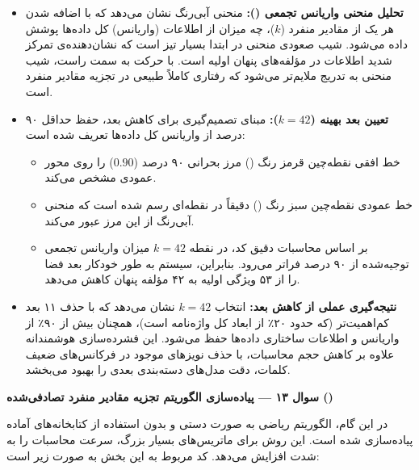\documentclass{article}
\begin{document}
    \begin{itemize}
        \item \textbf{تحلیل منحنی واریانس تجمعی ():}
        منحنی آبی‌رنگ نشان می‌دهد که با اضافه شدن هر یک از مقادیر منفرد ($k$)، چه میزان از اطلاعات (واریانس) کل داده‌ها پوشش داده می‌شود. شیب صعودی منحنی در ابتدا بسیار تیز است که نشان‌دهنده‌ی تمرکز شدید اطلاعات در مؤلفه‌های پنهان اولیه است. با حرکت به سمت راست، شیب منحنی به تدریج ملایم‌تر می‌شود که رفتاری کاملاً طبیعی در تجزیه مقادیر منفرد است.

        \item \textbf{تعیین بعد بهینه ($k=42$):}
        مبنای تصمیم‌گیری برای کاهش بعد، حفظ حداقل ۹۰ درصد از واریانس کل داده‌ها تعریف شده است:
        \begin{itemize}
            \item خط افقی نقطه‌چین قرمز رنگ () مرز بحرانی ۹۰ درصد ($0.90$) را روی محور عمودی مشخص می‌کند.
            \item خط عمودی نقطه‌چین سبز رنگ () دقیقاً در نقطه‌ای رسم شده است که منحنی آبی‌رنگ از این مرز عبور می‌کند.
            \item بر اساس محاسبات دقیق کد، در نقطه $k = 42$ میزان واریانس تجمعی توجیه‌شده از ۹۰ درصد فراتر می‌رود. بنابراین، سیستم به طور خودکار بعد فضا را از ۵۳ ویژگی اولیه به ۴۲ مؤلفه پنهان کاهش می‌دهد.
        \end{itemize}

        \item \textbf{نتیجه‌گیری عملی از کاهش بعد:}
        انتخاب $k=42$ نشان می‌دهد که با حذف ۱۱ بعد کم‌اهمیت‌تر (که حدود ۲۰٪ از ابعاد کل واژه‌نامه است)، همچنان بیش از ۹۰٪ از واریانس و اطلاعات ساختاری داده‌ها حفظ می‌شود. این فشرده‌سازی هوشمندانه علاوه بر کاهش حجم محاسبات، با حذف نویزهای موجود در فرکانس‌های ضعیف کلمات، دقت مدل‌های دسته‌بندی بعدی را بهبود می‌بخشد.
    \end{itemize}    

\noindent\textbf{سوال ۱۳ --- پیاده‌سازی الگوریتم تجزیه مقادیر منفرد تصادفی‌شده ()}
    
   \noindent در این گام، الگوریتم ریاضی  به صورت دستی و بدون استفاده از کتابخانه‌های آماده پیاده‌سازی شده است. این روش برای ماتریس‌های بسیار بزرگ، سرعت محاسبات را به شدت افزایش می‌دهد. کد مربوط به این بخش به صورت زیر است:
\end{document}
